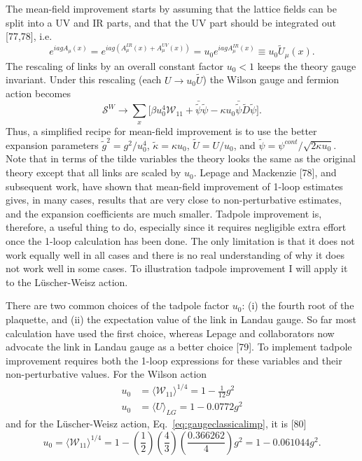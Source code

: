 The mean-field improvement starts by assuming that the lattice fields
can be split into a UV and IR parts, and that the UV part should be
integrated out [77,78], i.e.
\begin{equation}
e^{iagA_\mu(x)} = e^{iag(A_\mu^{IR}(x)+A_\mu^{UV}(x))}
    = u_0 e^{iagA_\mu^{IR}(x)} \equiv u_0 \tilde U_\mu(x).
\end{equation}
The rescaling of links by an overall constant factor $u_0 < 1$ keeps
the theory gauge invariant.  Under this rescaling (each $U \to u_0
\tilde U$) the Wilson gauge and fermion action becomes
\begin{equation}
\mathcal{S}^W \to \sum_x \bigg[\beta u_0^4\mathcal{W}_{11}
    + \bar{\tilde\psi}\tilde\psi
    - \kappa u_0 \bar{\tilde\psi}\tilde D\tilde\psi\bigg].
\end{equation}
Thus, a simplified recipe for mean-field improvement is to use the
better expansion parameters $\tilde g^2 = g^2/u_0^4$, $\tilde\kappa =
\kappa u_0$, $\tilde U = U/u_0$, and $\tilde\psi =
\psi^{cont}/\sqrt{2\kappa u_0}$.  Note that in terms of the tilde
variables the theory looks the same as the original theory except that
all links are scaled by $u_0$.  Lepage and Mackenzie [78], and
subsequent work, have shown that mean-field improvement of 1-loop
estimates gives, in many cases, results that are very close to
non-perturbative estimates, and the expansion coefficients are much
smaller.  Tadpole improvement is, therefore, a useful thing to do,
especially since it requires negligible extra effort once the 1-loop
calculation has been done.  The only limitation is that it does not
work equally well in all cases and there is no real understanding of
why it does not work well in some cases.  To illustration tadpole
improvement I will apply it to the L\"uscher-Weisz action.

There are two common choices of the tadpole factor $u_0$: (i) the
fourth root of the plaquette, and (ii) the expectation value of the
link in Landau gauge.  So far most calculation have used the first
choice, whereas Lepage and collaborators now advocate the link in
Landau gauge as a better choice [79].  To implement tadpole improvement
requires both the 1-loop expressions for these variables and their
non-perturbative values.  For the Wilson action
\begin{equation}
\begin{aligned}
u_0 &= \langle\mathcal{W}_{11}\rangle^{1/4} = 1 - \frac{1}{12}g^2\\
u_0 &= \langle U\rangle_{LG} = 1 - 0.0772g^2
\end{aligned}
\end{equation}
and for the L\"uscher-Weisz action, Eq.~\ref{eq:gaugeclassicalimp}, it
is [80]
\begin{equation}
u_0 = \langle\mathcal{W}_{11}\rangle^{1/4}
    = 1 - \left(\frac{1}{2}\right)\left(\frac{4}{3}\right)
        \left(\frac{0.366262}{4}\right)g^2
    = 1 - 0.061044g^2.
\end{equation}

